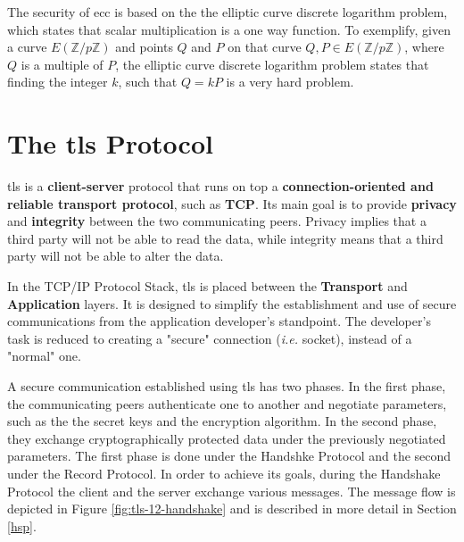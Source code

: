 \documentclass{llncs}
\begin{document}
The security of \gls{ecc} is based on the the elliptic curve discrete logarithm
problem, which states that scalar multiplication is a one way function. To exemplify,
given a curve $E(\mathbb{Z}/p\mathbb{Z})$ and points $Q$ and $P$ on that curve
$Q,P \in E(\mathbb{Z}/p\mathbb{Z})$, where $Q$ is a multiple of $P$, the elliptic curve discrete logarithm problem
states that finding the integer $k$, such that $Q=kP$ is a very hard problem.

\section{The \gls{tls} Protocol}

\gls{tls} is a \textbf{client-server} protocol
that runs on top a \textbf{connection-oriented and reliable transport protocol},
such as \textbf{TCP}. Its main goal is to provide \textbf{privacy} and \textbf{integrity}
between the two communicating peers. Privacy implies that a third party will not
be able to read the data, while integrity means that a third party will not be
able to alter the data.

In the TCP/IP Protocol Stack, \gls{tls} is placed between the \textbf{Transport}
and \textbf{Application} layers. It is designed to simplify the establishment
and use of secure communications from the application developer's standpoint.
The developer's task is reduced to creating a "secure" connection (\textit{i.e.} socket), instead of a "normal" one.

A secure communication established using \gls{tls} has two phases. In the first
phase, the communicating peers authenticate one to another and negotiate parameters, such as the the secret keys and the encryption algorithm. In the
second phase, they exchange cryptographically protected data under
the previously negotiated parameters. The first phase is done under the
Handshke Protocol and the second under the Record Protocol. In order to
achieve its goals, during the Handshake Protocol the client and the server
exchange various messages. The message flow is depicted in Figure \ref{fig:tls-12-handshake} and is described in more detail in Section
\ref{hsp}.
\end{document}
